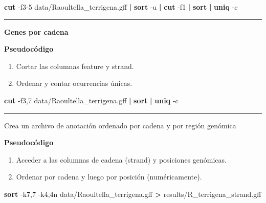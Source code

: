 \documentclass[
]{book}
\newenvironment{Shaded}{\begin{snugshade}}{\end{snugshade}}
\newcommand{\AttributeTok}[1]{\textcolor[rgb]{0.13,0.29,0.53}{#1}}
\newcommand{\FunctionTok}[1]{\textcolor[rgb]{0.13,0.29,0.53}{\textbf{#1}}}
\newcommand{\KeywordTok}[1]{\textcolor[rgb]{0.13,0.29,0.53}{\textbf{#1}}}
\newcommand{\NormalTok}[1]{#1}
\newcommand{\OperatorTok}[1]{\textcolor[rgb]{0.81,0.36,0.00}{\textbf{#1}}}
\begin{document}
\begin{Shaded}
\begin{Highlighting}[]
\FunctionTok{cut} \AttributeTok{{-}f3{-}5}\NormalTok{ data/Raoultella\_terrigena.gff }\KeywordTok{|} \FunctionTok{sort} \AttributeTok{{-}u} \KeywordTok{|} \FunctionTok{cut} \AttributeTok{{-}f1} \KeywordTok{|} \FunctionTok{sort} \KeywordTok{|} \FunctionTok{uniq} \AttributeTok{{-}c}
\end{Highlighting}
\end{Shaded}

\begin{center}\rule{0.5\linewidth}{0.5pt}\end{center}

\textbf{Genes por cadena}

\textbf{Pseudocódigo}

\begin{enumerate}
\def\labelenumi{\arabic{enumi}.}
\item
  Cortar las columnas feature y strand.
\item
  Ordenar y contar ocurrencias únicas.
\end{enumerate}

\begin{Shaded}
\begin{Highlighting}[]
\FunctionTok{cut} \AttributeTok{{-}f3,7}\NormalTok{ data/Raoultella\_terrigena.gff }\KeywordTok{|} \FunctionTok{sort} \KeywordTok{|} \FunctionTok{uniq} \AttributeTok{{-}c}
\end{Highlighting}
\end{Shaded}

\begin{center}\rule{0.5\linewidth}{0.5pt}\end{center}

Crea un archivo de anotación ordenado por cadena y por región genómica

\textbf{Pseudocódigo}

\begin{enumerate}
\def\labelenumi{\arabic{enumi}.}
\item
  Acceder a las columnas de cadena (strand) y posiciones genómicas.
\item
  Ordenar por cadena y luego por posición (numéricamente).
\end{enumerate}

\begin{Shaded}
\begin{Highlighting}[]
\FunctionTok{sort} \AttributeTok{{-}k7,7} \AttributeTok{{-}k4,4n}\NormalTok{ data/Raoultella\_terrigena.gff }\OperatorTok{\textgreater{}}\NormalTok{ results/R\_terrigena\_strand.gff}
\end{Highlighting}
\end{Shaded}
\end{document}
